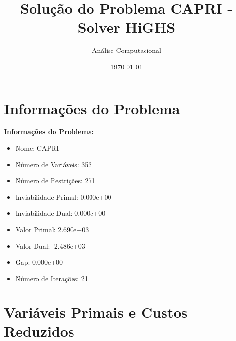 \documentclass[12pt]{article}
\title{Solução do Problema CAPRI - Solver HiGHS}
\author{Análise Computacional}
\date{\today}
\begin{document}
\maketitle

\section{Informações do Problema}

\textbf{Informações do Problema:}
\begin{itemize}
\item Nome: CAPRI
\item Número de Variáveis: 353
\item Número de Restrições: 271
\item Inviabilidade Primal: 0.000e+00
\item Inviabilidade Dual: 0.000e+00
\item Valor Primal: 2.690e+03
\item Valor Dual: -2.486e+03
\item Gap: 0.000e+00
\item Número de Iterações: 21
\end{itemize}


\section{Variáveis Primais e Custos Reduzidos}
\end{document}
